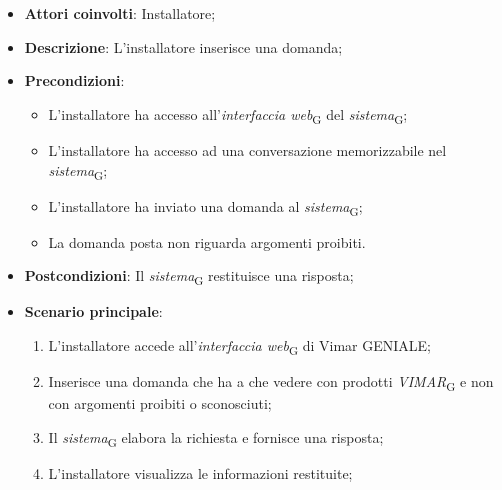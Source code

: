 \begin{itemize}
    \item \textbf{Attori coinvolti}: Installatore;
    \item \textbf{Descrizione}: L’installatore inserisce una domanda;
    \item \textbf{Precondizioni}: 
        \begin{itemize}
            \item L’installatore ha accesso all’\textit{interfaccia web}\textsubscript{G} del \textit{sistema}\textsubscript{G};
            \item L’installatore ha accesso ad una conversazione memorizzabile nel \textit{sistema}\textsubscript{G};
            \item L'installatore ha inviato una domanda al \textit{sistema}\textsubscript{G};
            \item La domanda posta non riguarda argomenti proibiti.
        \end{itemize}
    \item \textbf{Postcondizioni}: Il \textit{sistema}\textsubscript{G} restituisce una risposta;
    \item \textbf{Scenario principale}:
    \begin{enumerate}
    \item L’installatore accede all’\textit{interfaccia web}\textsubscript{G} di Vimar GENIALE;
    \item Inserisce una domanda che ha a che vedere con prodotti \textit{VIMAR}\textsubscript{G} e non con argomenti proibiti o sconosciuti;
    \item Il \textit{sistema}\textsubscript{G} elabora la richiesta e fornisce una risposta;
    \item L’installatore visualizza le informazioni restituite;
    \end{enumerate}
\end{itemize}

